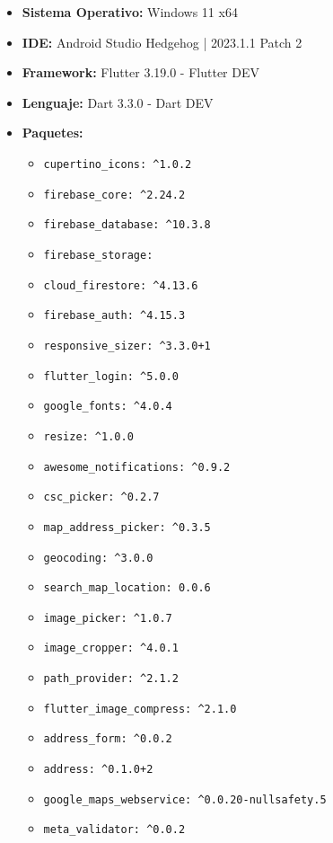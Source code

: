 \documentclass[a4paper, 12pt]{article}
\begin{document}
\begin{itemize}[noitemsep]
	\item \textbf{Sistema Operativo:} Windows 11 x64
	\item \textbf{IDE:} Android Studio Hedgehog | 2023.1.1 Patch 2
	\item \textbf{Framework:} Flutter 3.19.0 -  Flutter DEV \cite{flutter_dev}
	\item \textbf{Lenguaje:} Dart 3.3.0 - Dart DEV \cite{dart_dev}
	\item \textbf{Paquetes:}
		\begin{itemize}[noitemsep]
		  \item \texttt{cupertino\_icons: \^{}1.0.2}
		  \item \texttt{firebase\_core: \^{}2.24.2}
		  \item \texttt{firebase\_database: \^{}10.3.8}
		  \item \texttt{firebase\_storage:}
		  \item \texttt{cloud\_firestore: \^{}4.13.6}
		  \item \texttt{firebase\_auth: \^{}4.15.3}
		  \item \texttt{responsive\_sizer: \^{}3.3.0+1}
		  \item \texttt{flutter\_login: \^{}5.0.0}
		  \item \texttt{google\_fonts: \^{}4.0.4}
		  \item \texttt{resize: \^{}1.0.0}
		  \item \texttt{awesome\_notifications: \^{}0.9.2}
		  \item \texttt{csc\_picker: \^{}0.2.7}
		  \item \texttt{map\_address\_picker: \^{}0.3.5}
		  \item \texttt{geocoding: \^{}3.0.0}
		  \item \texttt{search\_map\_location: 0.0.6}
		  \item \texttt{image\_picker: \^{}1.0.7}
		  \item \texttt{image\_cropper: \^{}4.0.1}
		  \item \texttt{path\_provider: \^{}2.1.2}
		  \item \texttt{flutter\_image\_compress: \^{}2.1.0}
		  \item \texttt{address\_form: \^{}0.0.2}
		  \item \texttt{address: \^{}0.1.0+2}
		  \item \texttt{google\_maps\_webservice: \^{}0.0.20-nullsafety.5}
		  \item \texttt{meta\_validator: \^{}0.0.2}

\end{itemize}
\end{itemize}
\end{document}

